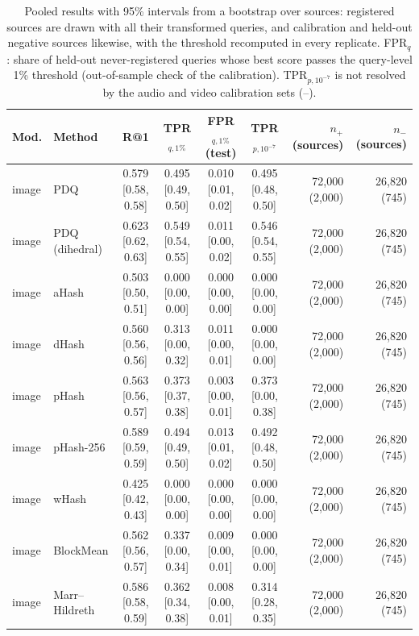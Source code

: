 \begin{table}[!t]
\centering
\scriptsize
\caption{Pooled results with 95\% intervals from a bootstrap over sources: registered sources are drawn with all their transformed queries, and calibration and held-out negative sources likewise, with the threshold recomputed in every replicate. FPR$_q$: share of held-out never-registered queries whose best score passes the query-level 1\% threshold (out-of-sample check of the calibration). TPR$_{p,10^{-7}}$ is not resolved by the audio and video calibration sets (--).}
\label{tab:ci}
\setlength{\tabcolsep}{3pt}
\begin{tabular}{llccccrr}
\toprule
Mod. & Method & R@1 & TPR$_{q,1\%}$ & FPR$_{q,1\%}$ (test) & TPR$_{p,10^{-7}}$ & $n_+$ (sources) & $n_-$ (sources) \\
\midrule
image & PDQ & 0.579 \tiny[0.58, 0.58] & 0.495 \tiny[0.49, 0.50] & 0.010 \tiny[0.01, 0.02] & 0.495 \tiny[0.48, 0.50] & 72{,}000 (2{,}000) & 26{,}820 (745) \\
image & PDQ (dihedral) & 0.623 \tiny[0.62, 0.63] & 0.549 \tiny[0.54, 0.55] & 0.011 \tiny[0.00, 0.02] & 0.546 \tiny[0.54, 0.55] & 72{,}000 (2{,}000) & 26{,}820 (745) \\
image & aHash & 0.503 \tiny[0.50, 0.51] & 0.000 \tiny[0.00, 0.00] & 0.000 \tiny[0.00, 0.00] & 0.000 \tiny[0.00, 0.00] & 72{,}000 (2{,}000) & 26{,}820 (745) \\
image & dHash & 0.560 \tiny[0.56, 0.56] & 0.313 \tiny[0.00, 0.32] & 0.011 \tiny[0.00, 0.01] & 0.000 \tiny[0.00, 0.00] & 72{,}000 (2{,}000) & 26{,}820 (745) \\
image & pHash & 0.563 \tiny[0.56, 0.57] & 0.373 \tiny[0.37, 0.38] & 0.003 \tiny[0.00, 0.01] & 0.373 \tiny[0.00, 0.38] & 72{,}000 (2{,}000) & 26{,}820 (745) \\
image & pHash-256 & 0.589 \tiny[0.59, 0.59] & 0.494 \tiny[0.49, 0.50] & 0.013 \tiny[0.01, 0.02] & 0.492 \tiny[0.48, 0.50] & 72{,}000 (2{,}000) & 26{,}820 (745) \\
image & wHash & 0.425 \tiny[0.42, 0.43] & 0.000 \tiny[0.00, 0.00] & 0.000 \tiny[0.00, 0.00] & 0.000 \tiny[0.00, 0.00] & 72{,}000 (2{,}000) & 26{,}820 (745) \\
image & BlockMean & 0.562 \tiny[0.56, 0.57] & 0.337 \tiny[0.00, 0.34] & 0.009 \tiny[0.00, 0.01] & 0.000 \tiny[0.00, 0.00] & 72{,}000 (2{,}000) & 26{,}820 (745) \\
image & Marr–Hildreth & 0.586 \tiny[0.58, 0.59] & 0.362 \tiny[0.34, 0.38] & 0.008 \tiny[0.00, 0.01] & 0.314 \tiny[0.28, 0.35] & 72{,}000 (2{,}000) & 26{,}820 (745) \\

\end{tabular}
\end{table}
